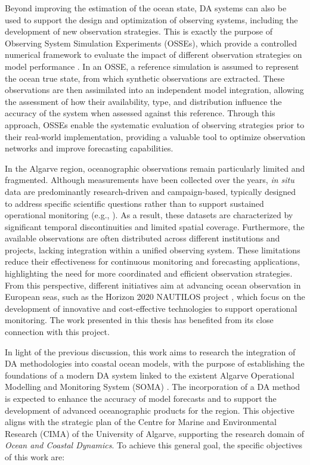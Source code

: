 Beyond improving the estimation of the ocean state, DA systems can also be used to support the design and optimization of observing systems, including the development of new observation strategies. This is exactly the purpose of Observing System Simulation Experiments (OSSEs), which provide a controlled numerical framework to evaluate the impact of different observation strategies on model performance \parencite{halliwell2014Rigorous, halliwell2015osse}. In an OSSE, a reference simulation is assumed to represent the ocean true state, from which synthetic observations are extracted. These observations are then assimilated into an independent model integration, allowing the assessment of how their availability, type, and distribution influence the accuracy of the system when assessed against this reference. Through this approach, OSSEs enable the systematic evaluation of observing strategies prior to their real-world implementation, providing a valuable tool to optimize observation networks and improve forecasting capabilities.

In the Algarve region, oceanographic observations remain particularly limited and fragmented. Although measurements have been collected over the years, \emph{in situ} data are predominantly research-driven and campaign-based, typically designed to address specific scientific questions rather than to support sustained operational monitoring (e.g., \textcite{rautenbach2024, oliveira2024, garel2016characterisation}). As a result, these datasets are characterized by significant temporal discontinuities and limited spatial coverage. Furthermore, the available observations are often distributed across different institutions and projects, lacking integration within a unified observing system. These limitations reduce their effectiveness for continuous monitoring and forecasting applications, highlighting the need for more coordinated and efficient observation strategies. From this perspective, different initiatives aim at advancing ocean observation in European seas, such as the Horizon 2020 NAUTILOS project \parencite{novellino2022new}, which focus on the development of innovative and cost-effective technologies to support operational monitoring. The work presented in this thesis has benefited from its close connection with this project.

In light of the previous discussion, this work aims to research the integration of DA methodologies into coastal ocean models, with the purpose of establishing the foundations of a modern DA system linked to the existent Algarve Operational Modelling and Monitoring System (SOMA) \parencite{cima2024soma}. The incorporation of a DA method is expected to enhance the accuracy of model forecasts and to support the development of advanced oceanographic products for the region. This objective aligns with the strategic plan of the Centre for Marine and Environmental Research (CIMA) of the University of Algarve, supporting the research domain of \emph{Ocean and Coastal Dynamics}. To achieve this general goal, the specific objectives of this work are:

